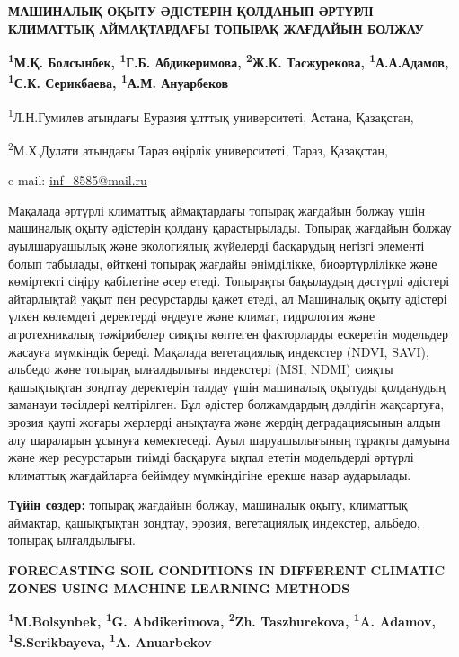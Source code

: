 \begin{articleheader}
{\bfseries МАШИНАЛЫҚ ОҚЫТУ ӘДІСТЕРІН ҚОЛДАНЫП ӘРТҮРЛІ КЛИМАТТЫҚ
АЙМАҚТАРДАҒЫ ТОПЫРАҚ ЖАҒДАЙЫН БОЛЖАУ}

{\bfseries
\textsuperscript{1}М.Қ. Болсынбек,
\textsuperscript{1}Г.Б. Абдикеримова,
\textsuperscript{2}Ж.К. Тасжурекова,
\textsuperscript{1}А.А.Адамов,
\textsuperscript{1}С.К. Серикбаева\textsuperscript{\envelope },
\textsuperscript{1}А.М. Ануарбеков
}
\end{articleheader}

\begin{affiliation}
\textsuperscript{1}Л.Н.Гумилев атындағы Еуразия ұлттық университеті, Астана, Қазақстан,

\textsuperscript{2}М.Х.Дулати атындағы Тараз өңірлік университеті, Тараз, Қазақстан,

e-mail: \href{mailto:inf\_8585@mail.ru}{inf\_8585@mail.ru}
\end{affiliation}

Мақалада әртүрлі климаттық аймақтардағы топырақ жағдайын болжау үшін
машиналық оқыту әдістерін қолдану қарастырылады. Топырақ жағдайын болжау
ауылшаруашылық және экологиялық жүйелерді басқарудың негізгі элементі
болып табылады, өйткені топырақ жағдайы өнімділікке, биоәртүрлілікке
және көміртекті сіңіру қабілетіне әсер етеді. Топырақты бақылаудың
дәстүрлі әдістері айтарлықтай уақыт пен ресурстарды қажет етеді, ал
Машиналық оқыту әдістері үлкен көлемдегі деректерді өңдеуге және климат,
гидрология және агротехникалық тәжірибелер сияқты көптеген факторларды
ескеретін модельдер жасауға мүмкіндік береді. Мақалада вегетациялық
индекстер (NDVI, SAVI), альбедо және топырақ ылғалдылығы индекстері
(MSI, NDMI) сияқты қашықтықтан зондтау деректерін талдау үшін машиналық
оқытуды қолданудың заманауи тәсілдері келтірілген. Бұл әдістер
болжамдардың дәлдігін жақсартуға, эрозия қаупі жоғары жерлерді анықтауға
және жердің деградациясының алдын алу шараларын ұсынуға көмектеседі.
Ауыл шаруашылығының тұрақты дамуына және жер ресурстарын тиімді
басқаруға ықпал ететін модельдерді әртүрлі климаттық жағдайларға
бейімдеу мүмкіндігіне ерекше назар аударылады.

{\bfseries Түйін сөздер:} топырақ жағдайын болжау, машиналық оқыту,
климаттық аймақтар, қашықтықтан зондтау, эрозия, вегетациялық индекстер,
альбедо, топырақ ылғалдылығы.

\begin{articleheader}
{\bfseries FORECASTING SOIL CONDITIONS IN DIFFERENT CLIMATIC ZONES USING
MACHINE LEARNING METHODS}

{\bfseries
\textsuperscript{1}M.Bolsynbek,
\textsuperscript{1}G. Abdikerimova,
\textsuperscript{2}Zh. Taszhurekova,
\textsuperscript{1}A. Adamov,
\textsuperscript{1}S.Serikbayeva\textsuperscript{\envelope },
\textsuperscript{1}A. Anuarbekov
}
\end{articleheader}

